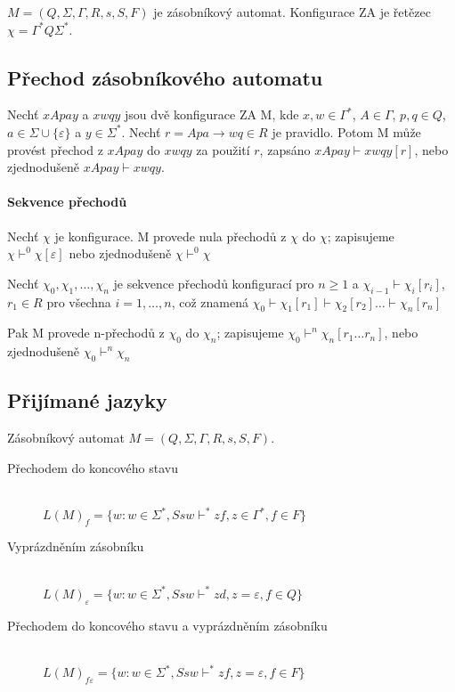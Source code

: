 \documentclass[a4wide]{report}
\begin{document}
$M = (Q, \Sigma, \Gamma, R, s, S, F)$ je zásobníkový automat. Konfigurace ZA je řetězec $\chi = \Gamma^* Q \Sigma^*$.

\subsection{Přechod zásobníkového automatu}

Nechť $xApay$ a $xwqy$ jsou dvě konfigurace ZA M, kde $x, w \in \Gamma^*$, $A \in \Gamma$, $p, q \in Q$, $a \in \Sigma \cup \{ \varepsilon \}$ a $y \in \Sigma^*$. Nechť $r = Apa \to wq \in R$ je pravidlo. Potom M může provést přechod z $xApay$ do $xwqy$ za použití $r$, zapsáno $xApay \vdash xwqy [r]$, nebo zjednodušeně $xApay \vdash xwqy$.

\paragraph{Sekvence přechodů}

Nechť $\chi$ je konfigurace. M provede nula přechodů z $\chi$ do $\chi$; zapisujeme $\chi \vdash^0 \chi [\varepsilon]$ nebo zjednodušeně $\chi \vdash^0 \chi$

Nechť $\chi_0, \chi_1, \dots, \chi_n$ je sekvence přechodů konfigurací pro $n \geq 1$ a $\chi_{i-1} \vdash \chi_i [r_i]$, $r_1 \in R$ pro všechna $i = 1, \dots, n$, což znamená $\chi_0 \vdash \chi_1 [r_1] \vdash \chi_2 [r_2] \dots \vdash \chi_n [r_n]$

Pak M provede n-přechodů z $\chi_0$ do $\chi_n$; zapisujeme $\chi_0 \vdash^n \chi_n [r_1 \dots r_n]$, nebo zjednodušeně $\chi_0 \vdash^n \chi_n$

\subsection{Přijímané jazyky}

Zásobníkový automat $M = (Q, \Sigma, \Gamma, R, s, S, F)$.

\begin{description}
	\item[Přechodem do koncového stavu] \hfill \\
	$L(M)_f = \{w: w \in \Sigma^*, Ssw \vdash^* zf, z \in \Gamma^*, f \in F  \}$
	
	\item[Vyprázdněním zásobníku] \hfill \\
	$L(M)_{\varepsilon} = \{ w: w \in \Sigma^*, Ssw \vdash^* zd, z = \varepsilon, f \in Q \}$
	
	\item[Přechodem do koncového stavu a vyprázdněním zásobníku] \hfill \\
	$L(M)_{f \varepsilon} = \{ w: w \in \Sigma^*, Ssw \vdash^* zf, z = \varepsilon, f \in F \}$
\end{description}
\end{document}
